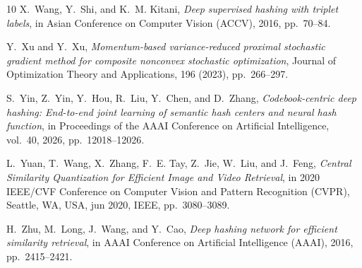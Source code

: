 \documentclass[11pt]{article}
\begin{document}
\begin{thebibliography}{10}
{\sc X.~Wang, Y.~Shi, and K.~M. Kitani}, {\em Deep supervised hashing with
  triplet labels}, in Asian Conference on Computer Vision (ACCV), 2016,
  pp.~70--84.

{\sc Y.~Xu and Y.~Xu}, {\em Momentum-based variance-reduced proximal stochastic
  gradient method for composite nonconvex stochastic optimization}, Journal of
  Optimization Theory and Applications, 196 (2023), pp.~266--297.

{\sc S.~Yin, Z.~Yin, Y.~Hou, R.~Liu, Y.~Chen, and D.~Zhang}, {\em
  Codebook-centric deep hashing: End-to-end joint learning of semantic hash
  centers and neural hash function}, in Proceedings of the AAAI Conference on
  Artificial Intelligence, vol.~40, 2026, pp.~12018--12026.

{\sc L.~Yuan, T.~Wang, X.~Zhang, F.~E. Tay, Z.~Jie, W.~Liu, and J.~Feng}, {\em
  Central {{Similarity Quantization}} for {{Efficient Image}} and {{Video
  Retrieval}}}, in 2020 {{IEEE}}/{{CVF Conference}} on {{Computer Vision}} and
  {{Pattern Recognition}} ({{CVPR}}), Seattle, WA, USA, jun 2020, IEEE,
  pp.~3080--3089.

{\sc H.~Zhu, M.~Long, J.~Wang, and Y.~Cao}, {\em Deep hashing network for
  efficient similarity retrieval}, in AAAI Conference on Artificial
  Intelligence (AAAI), 2016, pp.~2415--2421.

\end{thebibliography}
\end{document}
